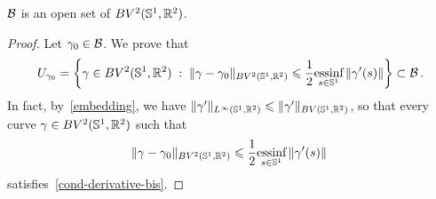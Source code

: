 \begin{prop}\label{openB0}   
$\mathcal{B}$ is an open set  of $BV^2(\mathbb{S}^1,\mathbb{R}^2)$. %
\end{prop}

\begin{proof}

Let $\gamma_0\in \mathcal{B}$. We prove that 
\begin{equation}\label{ball}
U_{\gamma_0} =		\left\{  \gamma\in BV^2(\mathbb{S}^1,\mathbb{R}^2) 
		 \;:\; 
			\| \gamma - \gamma_0 \|_{BV^2(\mathbb{S}^1,\mathbb{R}^2)} \leqslant \frac{1}{2} \underset{s\in\mathbb{S}^1}{\mbox{essinf}}\,\|\gamma'(s)\|
		 \right\}
		\subset \mathcal{B}\,.
\end{equation}
In fact, by~\eqref{embedding}, we have $\| \gamma' \|_{L^\infty(\mathbb{S}^1,{\mathbb R}^2)}\leqslant  \| \gamma' \|_{BV(\mathbb{S}^1,{\mathbb R}^2)}$,  so that  every curve $\gamma\in BV^2(\mathbb{S}^1,{\mathbb R}^2)$ such that  
$$\|\gamma - \gamma_0\|_{BV^2(\mathbb{S}^1,{\mathbb R}^2)}\leqslant\frac{1}{2} \underset{s\in\mathbb{S}^1}{\mbox{essinf}}\,\|\gamma'(s)\|\;$$
satisfies~\eqref{cond-derivative-bis}.  

\end{proof}


